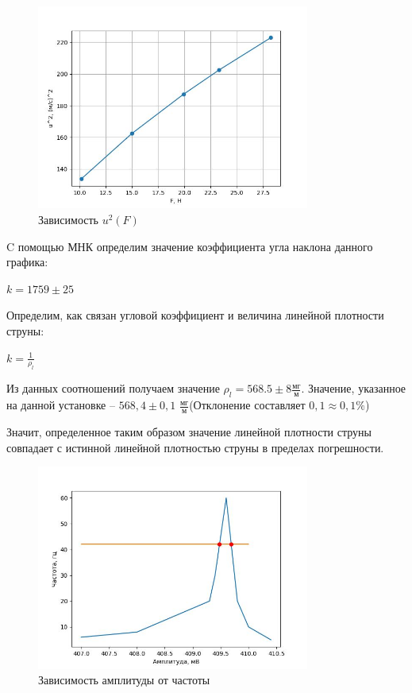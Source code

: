 \documentclass[12pt,a4paper]{article}
\begin{document}
\begin{figure}[h!]
	\begin{center}
		\includegraphics[width = 0.8\textwidth]{res2}
		\caption{Зависимость $u^{2}\left(F\right)$}
		\label{fig:u_sqr_depends_of_force}
	\end{center}
\end{figure}

C помощью МНК определим значение коэффициента угла наклона данного графика:

$ k = 1759 \pm 25$

Определим, как связан угловой коэффициент и величина линейной плотности струны:

$k = \frac{1}{\rho_{l}}$

Из данных соотношений получаем значение $\rho_{l} = 568.5 \pm 8 \frac{\text{мг}}{\text{м}}$. Значение, указанное на данной установке -- $568,4 \pm 0,1$  $\frac{\text{мг}}{\text{м}}$(Отклонение составляет $0,1 \approx 0,1 \%$)



Значит, определенное таким образом значение линейной плотности струны совпадает с истинной линейной плотностью струны в пределах погрешности.
\begin{figure}[h!]
	\begin{center}
		\includegraphics[width = 0.8\textwidth]{res3}
		\caption{Зависимость амплитуды от частоты}
		\label{fig:u_sqr_depends_of_force}
	\end{center}
\end{figure}
\end{document}
